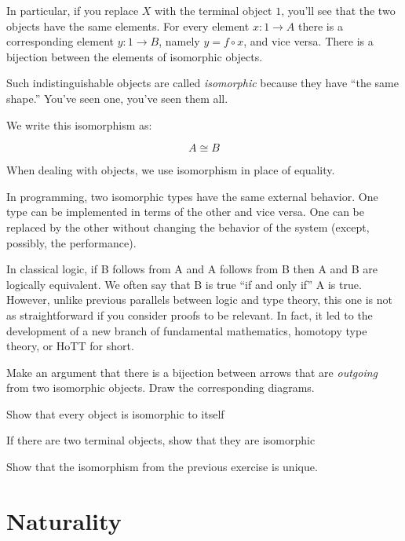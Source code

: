 \documentclass[DaoFP]{subfiles}
\begin{document}
In particular, if you replace $X$ with the terminal object $1$, you'll see that the two objects have the same elements. For every element $x \colon 1 \to A$ there is a corresponding element $y \colon 1 \to B$, namely $y = f \circ x$, and vice versa. There is a bijection between the elements of isomorphic objects.

Such indistinguishable objects are called \emph{isomorphic} because they have ``the same shape.'' You've seen one, you've seen them all. 

We write this isomorphism as:

\[A \cong B\]

When dealing with objects, we use isomorphism in place of equality.

In programming, two isomorphic types have the same external behavior. One type can be implemented in terms of the other and vice versa. One can be replaced by the other without changing the behavior of the system (except, possibly, the performance). 

In classical logic, if B follows from A and A follows from B then A and B are logically equivalent. We often say that B is true ``if and only if'' A is true. However, unlike previous parallels between logic and type theory, this one is not as straightforward if you consider proofs to be relevant. In fact, it led to the development of a new branch of fundamental mathematics, homotopy type theory, or HoTT for short.

\begin{exercise}
Make an argument that there is a bijection between arrows that are \emph{outgoing} from two isomorphic objects. Draw the corresponding diagrams.
\end{exercise}


\begin{exercise}
Show that every object is isomorphic to itself
\end{exercise}

\begin{exercise}
If there are two terminal objects, show that they are isomorphic
\end{exercise}

\begin{exercise}
Show that the isomorphism from the previous exercise is unique.
\end{exercise}

\section{Naturality}
\end{document}
